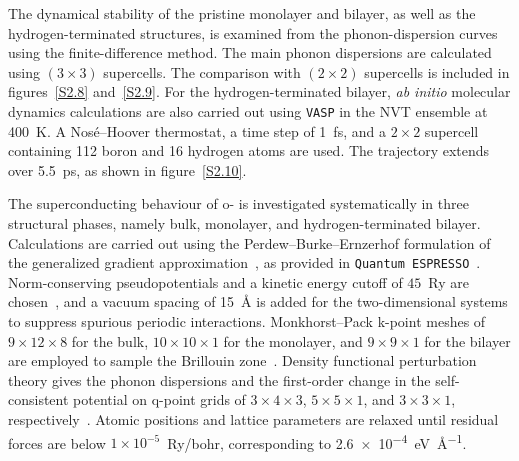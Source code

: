The dynamical stability of the pristine monolayer and bilayer,
as well as the hydrogen-terminated structures,
is examined from the phonon-dispersion curves using the finite-difference method.
The main phonon dispersions are calculated using $(3\times3)$ supercells.
The comparison with $(2\times2)$ supercells is included in figures~\ref{S2.8} and~\ref{S2.9}.
For the hydrogen-terminated bilayer,
\textit{ab initio} molecular dynamics calculations are also carried out using \texttt{VASP} in the NVT ensemble at \qty{400}{K}.
A Nosé--Hoover thermostat, a time step of \qty{1}{fs},
and a $2\times2$ supercell containing 112 boron and 16 hydrogen atoms are used.
The trajectory extends over \qty{5.5}{ps}, as shown in figure~\ref{S2.10}.

The superconducting behaviour of o- is investigated systematically in three structural phases,
namely bulk, monolayer, and hydrogen-terminated bilayer.
Calculations are carried out using the Perdew--Burke--Ernzerhof formulation of the generalized gradient approximation~\cite{perdew1996generalized},
as provided in \texttt{Quantum ESPRESSO}~\cite{giannozzi2009quantum}.
Norm-conserving pseudopotentials and a kinetic energy cutoff of $45$~Ry are chosen~\cite{hamann2013optimized},
and a vacuum spacing of \qty{15}{\angstrom} is added for the two-dimensional systems to suppress spurious periodic interactions.
Monkhorst--Pack k-point meshes of $9 \times 12 \times 8$ for the bulk,
$10 \times 10 \times 1$ for the monolayer,
and $9 \times 9 \times 1$ for the bilayer are employed to sample the Brillouin zone~\cite{monkhorst1976special}.
Density functional perturbation theory gives the phonon dispersions and the first-order change in the self-consistent potential
on q-point grids of $3 \times 4 \times 3$,
$5 \times 5 \times 1$, and $3 \times 3 \times 1$, respectively~\cite{baroni2001phonons}.
Atomic positions and lattice parameters are relaxed until residual forces are below $1\times10^{-5}$~Ry/bohr,
corresponding to \qty{2.6e-4}{\electronvolt\per\angstrom}.

